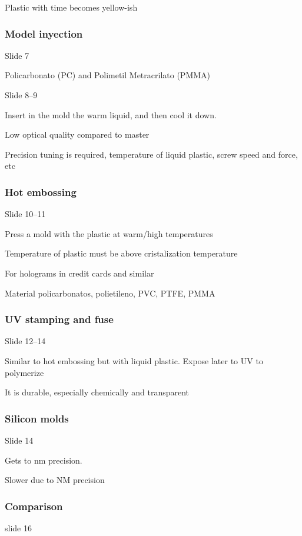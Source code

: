 \documentclass[../main/main.tex]{subfiles}
\begin{document}
Plastic with time becomes yellow-ish

\subsubsection{Model inyection}

Slide 7

Policarbonato (PC) and Polimetil Metracrilato (PMMA)


Slide 8--9

Insert in the mold the warm liquid, and then cool it down.

Low optical quality compared to master

Precision tuning is required, temperature of liquid plastic, screw speed and force, etc

\subsubsection{Hot embossing}

Slide 10--11

Press a mold with the plastic at warm/high temperatures

Temperature of plastic must be above cristalization temperature

For holograms in credit cards and similar

Material policarbonatos, polietileno, PVC, PTFE, PMMA

\subsubsection{UV stamping and fuse}

Slide 12--14

Similar to hot embossing but with liquid plastic. Expose later to UV to polymerize

It is durable, especially chemically and transparent

\subsubsection*{Silicon molds}

Slide 14

Gets to nm precision.

Slower due to NM precision

\subsubsection*{Comparison}
slide 16
\end{document}
